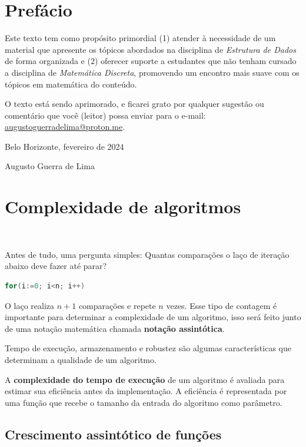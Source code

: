 \section*{Prefácio}

Este texto tem como propósito primordial (1) atender à necessidade de um material que apresente os tópicos abordados na disciplina de \textit{Estrutura de Dados} de forma organizada e (2) oferecer suporte a estudantes que não tenham cursado a disciplina de \textit{Matemática Discreta}, promovendo um encontro mais suave com os tópicos em matemática do conteúdo.

O texto está sendo aprimorado, e ficarei grato por qualquer sugestão ou comentário que você (leitor) possa enviar para o e-mail: \href{mailto:augustoguerradelima@proton.me}{augustoguerradelima@proton.me}.
\vspace{0.5cm}

{\raggedleft
Belo Horizonte, fevereiro de 2024

Augusto Guerra de Lima
\par}

\newpage
\section{Complexidade de algoritmos}
\

Antes de tudo, uma pergunta simples: Quantas comparações o laço de iteração abaixo deve fazer até parar?

\begin{lstlisting}[language=C, frame=single]
    for(i:=0; i<n; i++)
\end{lstlisting}

O laço realiza $n+1$ comparações e repete $n$ vezes. Esse tipo de contagem é importante para determinar a complexidade de um algoritmo, isso será feito junto de uma notação matemática chamada \textbf{notação assintótica}.

Tempo de execução, armazenamento e robustez são algumas características que determinam a qualidade de um algoritmo.

A \textbf{complexidade do tempo de execução} de um algoritmo é avaliada para estimar sua eficiência antes da implementação. A eficiência é representada por uma função que recebe o tamanho da entrada do algoritmo como parâmetro.

\subsection{Crescimento assintótico de funções}
\

